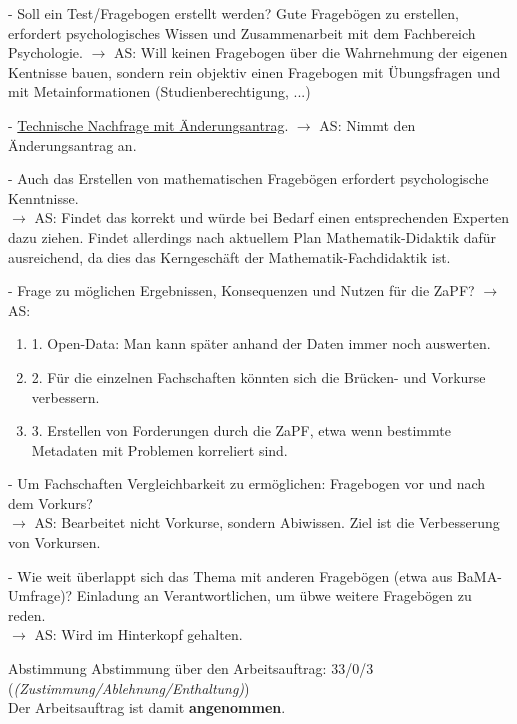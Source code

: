     \begin{outline}
      - Soll ein Test/Fragebogen erstellt werden? Gute Fragebögen zu erstellen, erfordert psychologisches Wissen und Zusammenarbeit mit dem Fachbereich Psychologie. $\rightarrow$ AS: Will keinen Fragebogen über die Wahrnehmung der eigenen Kentnisse bauen, sondern rein objektiv einen Fragebogen mit Übungsfragen und mit Metainformationen (Studienberechtigung, ...)

      - \underline{Technische Nachfrage mit Änderungsantrag}.
        $\rightarrow$ AS: Nimmt den Änderungsantrag an.

      - Auch das Erstellen von mathematischen Fragebögen erfordert psychologische Kenntnisse. \\
        $\rightarrow$ AS: Findet das korrekt und würde bei Bedarf einen entsprechenden Experten dazu ziehen. Findet allerdings nach aktuellem Plan Mathematik-Didaktik dafür ausreichend, da dies das Kerngeschäft der Mathematik-Fachdidaktik ist.

      - Frage zu möglichen Ergebnissen, Konsequenzen und Nutzen für die ZaPF? $\rightarrow$ AS:
        \begin{enumerate}
          \item 1. Open-Data: Man kann später anhand der Daten immer noch auswerten.
          \item 2. Für die einzelnen Fachschaften könnten sich die Brücken- und Vorkurse verbessern.
          \item 3. Erstellen von Forderungen durch die ZaPF, etwa wenn bestimmte Metadaten mit Problemen korreliert sind.
        \end{enumerate}

      - Um Fachschaften Vergleichbarkeit zu ermöglichen: Fragebogen vor und nach dem Vorkurs? \\
        $\rightarrow$ AS: Bearbeitet nicht Vorkurse, sondern Abiwissen. Ziel ist die Verbesserung von Vorkursen.

      - Wie weit überlappt sich das Thema mit anderen Fragebögen (etwa aus BaMA-Umfrage)? Einladung an Verantwortlichen, um übwe weitere Fragebögen zu reden. \\
        $\rightarrow$ AS: Wird im Hinterkopf gehalten.
    \end{outline}

    \begin{success}{Abstimmung}
      Abstimmung über den Arbeitsauftrag: 33/0/3 (\textit{(Zustimmung/Ablehnung/Enthaltung)}) \\
      Der Arbeitsauftrag ist damit \textbf{angenommen}.
    \end{success}


